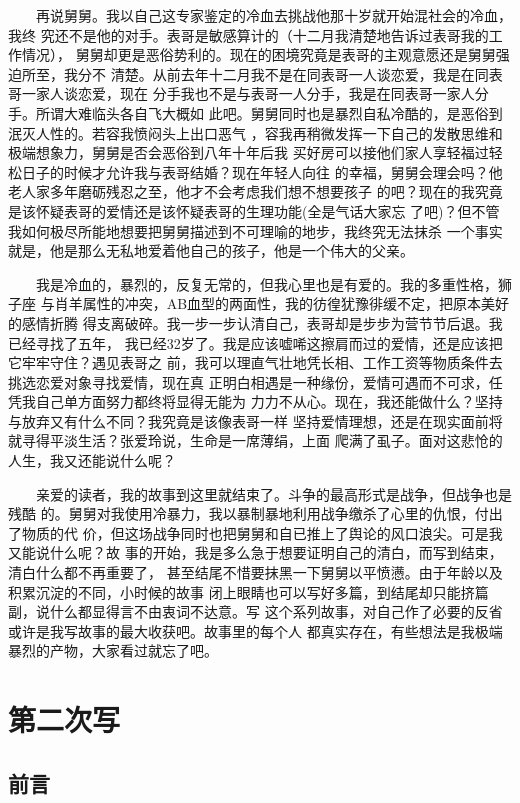 \documentclass[12pt]{book}
\begin{document}
　　再说舅舅。我以自己这专家鉴定的冷血去挑战他那十岁就开始混社会的冷血，我终
究还不是他的对手。表哥是敏感算计的（十二月我清楚地告诉过表哥我的工作情况），
舅舅却更是恶俗势利的。现在的困境究竟是表哥的主观意愿还是舅舅强迫所至，我分不
清楚。从前去年十二月我不是在同表哥一人谈恋爱，我是在同表哥一家人谈恋爱，现在
分手我也不是与表哥一人分手，我是在同表哥一家人分手。所谓大难临头各自飞大概如
此吧。舅舅同时也是暴烈自私冷酷的，是恶俗到泯灭人性的。若容我愤闷头上出口恶气
，容我再稍微发挥一下自己的发散思维和极端想象力，舅舅是否会恶俗到八年十年后我
买好房可以接他们家人享轻福过轻松日子的时候才允许我与表哥结婚？现在年轻人向往
的幸福，舅舅会理会吗？他老人家多年磨砺残忍之至，他才不会考虑我们想不想要孩子
的吧？现在的我究竟是该怀疑表哥的爱情还是该怀疑表哥的生理功能(全是气话大家忘
了吧)？但不管我如何极尽所能地想要把舅舅描述到不可理喻的地步，我终究无法抹杀
一个事实就是，他是那么无私地爱着他自己的孩子，他是一个伟大的父亲。

　　我是冷血的，暴烈的，反复无常的，但我心里也是有爱的。我的多重性格，狮子座
与肖羊属性的冲突，AB血型的两面性，我的彷徨犹豫徘缓不定，把原本美好的感情折腾
得支离破碎。我一步一步认清自己，表哥却是步步为营节节后退。我已经寻找了五年，
我已经32岁了。我是应该嘘唏这擦肩而过的爱情，还是应该把它牢牢守住？遇见表哥之
前，我可以理直气壮地凭长相、工作工资等物质条件去挑选恋爱对象寻找爱情，现在真
正明白相遇是一种缘份，爱情可遇而不可求，任凭我自己单方面努力都终将显得无能为
力力不从心。现在，我还能做什么？坚持与放弃又有什么不同？我究竟是该像表哥一样
坚持爱情理想，还是在现实面前将就寻得平淡生活？张爱玲说，生命是一席薄绢，上面
爬满了虱子。面对这悲怆的人生，我又还能说什么呢？

　　亲爱的读者，我的故事到这里就结束了。斗争的最高形式是战争，但战争也是残酷
的。舅舅对我使用冷暴力，我以暴制暴地利用战争缴杀了心里的仇恨，付出了物质的代
价，但这场战争同时也把舅舅和自已推上了舆论的风口浪尖。可是我又能说什么呢？故
事的开始，我是多么急于想要证明自己的清白，而写到结束，清白什么都不再重要了，
甚至结尾不惜要抹黑一下舅舅以平愤懑。由于年龄以及积累沉淀的不同，小时候的故事
闭上眼睛也可以写好多篇，到结尾却只能挤篇副，说什么都显得言不由衷词不达意。写
这个系列故事，对自己作了必要的反省或许是我写故事的最大收获吧。故事里的每个人
都真实存在，有些想法是我极端暴烈的产物，大家看过就忘了吧。

\chapter{第二次写}
\label{sec-9}
\section{前言}
\label{sec-9-1}
\end{document}
